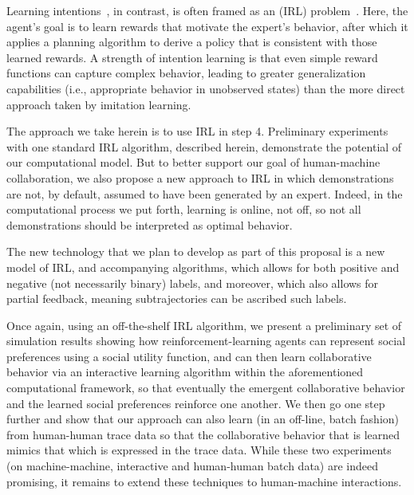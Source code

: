Learning intentions~\cite{macglashan15b}, in contrast, is often framed
as an  (IRL)
problem~\cite{ng00,babes11}.  Here, the agent's goal is to learn
rewards that motivate the expert's behavior, after which it applies a
planning algorithm to derive a policy that is consistent with those
learned rewards.  A strength of intention learning is that even simple
reward functions can capture complex behavior, leading to greater
generalization capabilities (i.e., appropriate behavior in unobserved
states) than the more direct approach taken by imitation learning.

The approach we take herein is to use IRL in step 4.  Preliminary
experiments with one standard IRL algorithm, described herein,
demonstrate the potential of our computational model.
%
But to better support our goal of human-machine collaboration, we also
propose a new approach to IRL in which demonstrations are not, by
default, assumed to have been generated by an expert.  Indeed, in the
computational process we put forth, learning is online, not off, so
not all demonstrations should be interpreted as optimal behavior.

The new technology that we plan to develop as part of this proposal is
a new model of IRL, and accompanying algorithms, which allows for both
positive and negative (not necessarily binary) labels, and moreover,
which also allows for partial feedback, meaning subtrajectories can be
ascribed such labels.

Once again, using an off-the-shelf IRL algorithm, we present a
preliminary set of simulation results showing how
reinforcement-learning agents
can represent social preferences using a social utility function, and
can then learn collaborative behavior via an interactive learning
algorithm within the aforementioned computational framework, so that
eventually the emergent collaborative behavior and the learned social
preferences reinforce one another.  We then go one step further and
show that our approach can also learn (in an off-line, batch fashion)
from human-human trace data so that the collaborative behavior that is
learned mimics that which is expressed in the trace data.  While these
two experiments (on machine-machine, interactive and human-human batch
data) are indeed promising, it remains to extend these techniques to
human-machine interactions.

